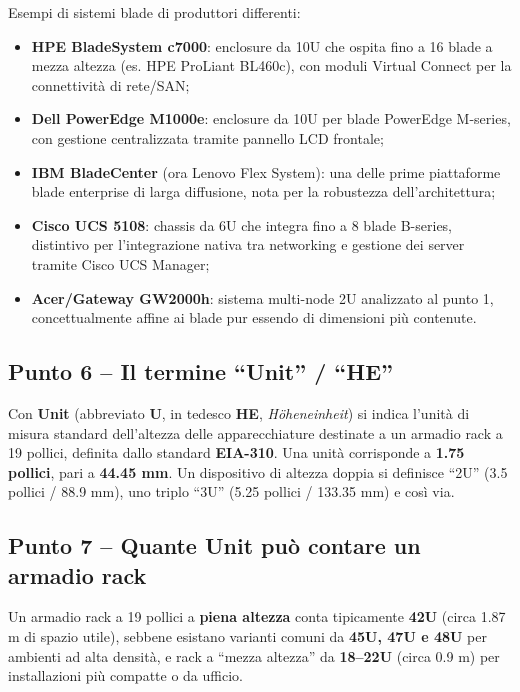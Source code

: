 \documentclass[11pt,a4paper]{article}
\begin{document}
Esempi di sistemi blade di produttori differenti:

\begin{itemize}[nosep]
    \item \textbf{HPE BladeSystem c7000}: enclosure da 10U che ospita fino a 16 blade a mezza altezza (es. HPE ProLiant BL460c), con moduli Virtual Connect per la connettività di rete/SAN;
    \item \textbf{Dell PowerEdge M1000e}: enclosure da 10U per blade PowerEdge M-series, con gestione centralizzata tramite pannello LCD frontale;
    \item \textbf{IBM BladeCenter} (ora Lenovo Flex System): una delle prime piattaforme blade enterprise di larga diffusione, nota per la robustezza dell'architettura;
    \item \textbf{Cisco UCS 5108}: chassis da 6U che integra fino a 8 blade B-series, distintivo per l'integrazione nativa tra networking e gestione dei server tramite Cisco UCS Manager;
    \item \textbf{Acer/Gateway GW2000h}: sistema multi-node 2U analizzato al punto 1, concettualmente affine ai blade pur essendo di dimensioni più contenute.
\end{itemize}

\subsection{Punto 6 -- Il termine ``Unit'' / ``HE''}

Con \textbf{Unit} (abbreviato \textbf{U}, in tedesco \textbf{HE}, \emph{H\"oheneinheit}) si indica l'unità di misura standard dell'altezza delle apparecchiature destinate a un armadio rack a 19 pollici, definita dallo standard \textbf{EIA-310}. Una unità corrisponde a \textbf{1.75 pollici}, pari a \textbf{44.45 mm}. Un dispositivo di altezza doppia si definisce ``2U'' (3.5 pollici / 88.9 mm), uno triplo ``3U'' (5.25 pollici / 133.35 mm) e così via.

\subsection{Punto 7 -- Quante Unit può contare un armadio rack}

Un armadio rack a 19 pollici a \textbf{piena altezza} conta tipicamente \textbf{42U} (circa 1.87 m di spazio utile), sebbene esistano varianti comuni da \textbf{45U, 47U e 48U} per ambienti ad alta densità, e rack a ``mezza altezza'' da \textbf{18--22U} (circa 0.9 m) per installazioni più compatte o da ufficio.
\end{document}
